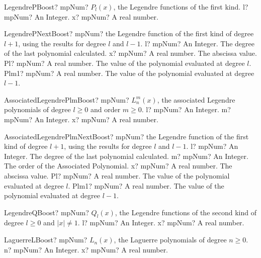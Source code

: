 \documentclass[12pt,a4paper,openany]{book}
\begin{document}
\begin{mpFunctionsExtract}
\mpFunctionTwo
{LegendrePBoost? mpNum? $P_l(x)$, the Legendre functions of the first kind.}
{l? mpNum? An Integer.}
{x? mpNum? A real number.}
\end{mpFunctionsExtract}

\begin{mpFunctionsExtract}
\mpFunctionFour
{LegendrePNextBoost? mpNum? the Legendre function of the first kind of degree $l+1$, using the results for degree $l$ and $l-1$.}
{l? mpNum? An Integer. The degree of the last polynomial calculated.}
{x? mpNum? A real number. The abscissa value.}
{Pl? mpNum? A real number. The value of the polynomial evaluated at degree $l$.}
{Plm1? mpNum? A real number. The value of the polynomial evaluated at degree $l-1$.}
\end{mpFunctionsExtract}

\begin{mpFunctionsExtract}
\mpFunctionThree
{AssociatedLegendrePlmBoost? mpNum? $L^m_n (x)$, the associated Legendre polynomials of degree $l \geq 0$ and order $m \geq 0$.}
{l? mpNum? An Integer.}
{m? mpNum? An Integer.}
{x? mpNum? A real number.}
\end{mpFunctionsExtract}

\begin{mpFunctionsExtract}
\mpFunctionFive
{AssociatedLegendrePlmNextBoost? mpNum? the Legendre function of the first kind of degree $l+1$, using the results for degree $l$ and $l-1$.}
{l? mpNum? An Integer. The degree of the last polynomial calculated.}
{m? mpNum? An Integer. The order of the Associated Polynomial.}
{x? mpNum? A real number. The abscissa value.}
{Pl? mpNum? A real number. The value of the polynomial evaluated at degree $l$.}
{Plm1? mpNum? A real number. The value of the polynomial evaluated at degree $l-1$.}
\end{mpFunctionsExtract}

\begin{mpFunctionsExtract}
\mpFunctionTwo
{LegendreQBoost? mpNum? $Q_l(x)$, the Legendre functions of the second kind of degree $l \geq 0$ and $|x| \neq 1$.}
{l? mpNum? An Integer.}
{x? mpNum? A real number.}
\end{mpFunctionsExtract}

\begin{mpFunctionsExtract}
\mpFunctionTwo
{LaguerreLBoost? mpNum? $L_n (x)$, the Laguerre polynomials of degree $n \geq 0$.}
{n? mpNum? An Integer.}
{x? mpNum? A real number.}
\end{mpFunctionsExtract}
\end{document}
